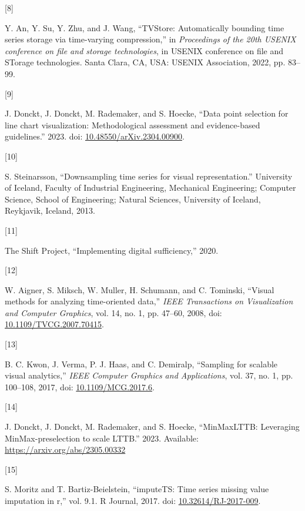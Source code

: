 \documentclass{article}
\newlength{\cslhangindent}
\newlength{\csllabelwidth}
\newlength{\cslentryspacingunit} %
\newenvironment{CSLReferences}[2] %
 {%
  \setlength{\parindent}{0pt}
  \ifodd #1
  \let\oldpar\par
  \def\par{\hangindent=\cslhangindent\oldpar}
  \fi
  \setlength{\parskip}{#2\cslentryspacingunit}
 }%
 {}
\newcommand{\CSLLeftMargin}[1]{\parbox[t]{\csllabelwidth}{#1}}
\newcommand{\CSLRightInline}[1]{\parbox[t]{\linewidth - \csllabelwidth}{#1}\break}
\begin{document}
\begin{CSLReferences}{0}{0}
\leavevmode{}%
\CSLLeftMargin{{[}8{]} }
\CSLRightInline{Y. An, Y. Su, Y. Zhu, and J. Wang, {``TVStore:
Automatically bounding time series storage via time-varying
compression,''} in \emph{Proceedings of the 20th USENIX conference on
file and storage technologies}, in USENIX conference on file and STorage
technologies. Santa Clara, CA, USA: USENIX Association, 2022, pp.
83--99.}

\leavevmode{}%
\CSLLeftMargin{{[}9{]} }
\CSLRightInline{J. Donckt, J. Donckt, M. Rademaker, and S. Hoecke,
{``Data point selection for line chart visualization: Methodological
assessment and evidence-based guidelines.''} 2023. doi:
\href{https://doi.org/10.48550/arXiv.2304.00900}{10.48550/arXiv.2304.00900}.}

\leavevmode{}%
\CSLLeftMargin{{[}10{]} }
\CSLRightInline{S. Steinarsson, {``Downsampling time series for visual
representation.''} University of Iceland, Faculty of Industrial
Engineering, Mechanical Engineering; Computer Science, School of
Engineering; Natural Sciences, University of Iceland, Reykjavik,
Iceland, 2013.}

\leavevmode{}%
\CSLLeftMargin{{[}11{]} }
\CSLRightInline{The Shift Project, {``Implementing digital
sufficiency,''} 2020.}

\leavevmode{}%
\CSLLeftMargin{{[}12{]} }
\CSLRightInline{W. Aigner, S. Miksch, W. Muller, H. Schumann, and C.
Tominski, {``Visual methods for analyzing time-oriented data,''}
\emph{IEEE Transactions on Visualization and Computer Graphics}, vol.
14, no. 1, pp. 47--60, 2008, doi:
\href{https://doi.org/10.1109/TVCG.2007.70415}{10.1109/TVCG.2007.70415}.}

\leavevmode{}%
\CSLLeftMargin{{[}13{]} }
\CSLRightInline{B. C. Kwon, J. Verma, P. J. Haas, and C. Demiralp,
{``Sampling for scalable visual analytics,''} \emph{IEEE Computer
Graphics and Applications}, vol. 37, no. 1, pp. 100--108, 2017, doi:
\href{https://doi.org/10.1109/MCG.2017.6}{10.1109/MCG.2017.6}.}

\leavevmode{}%
\CSLLeftMargin{{[}14{]} }
\CSLRightInline{J. Donckt, J. Donckt, M. Rademaker, and S. Hoecke,
{``MinMaxLTTB: Leveraging MinMax-preselection to scale LTTB.''} 2023.
Available: \url{https://arxiv.org/abs/2305.00332}}

\leavevmode{}%
\CSLLeftMargin{{[}15{]} }
\CSLRightInline{S. Moritz and T. Bartiz-Beielstein, {``imputeTS: Time
series missing value imputation in r,''} vol. 9.1. R Journal, 2017. doi:
\href{https://doi.org/10.32614/RJ-2017-009}{10.32614/RJ-2017-009}.}


\end{CSLReferences}
\end{document}
